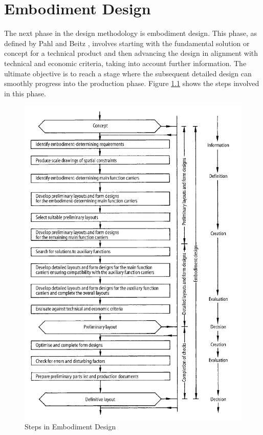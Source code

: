 \chapter{Embodiment Design}
The next phase in the design methodology is embodiment design. This phase, as defined by Pahl and Beitz \cite[227]{Pahl2007}, involves starting with the fundamental solution or concept for a technical product and then advancing the design in alignment with technical and economic criteria, taking into account further information. The ultimate objective is to reach a stage where the subsequent detailed design can smoothly progress into the production phase. Figure \ref{fig:embodiment_design} shows the steps involved in this phase.

\begin{figure}
    \centering
    \includegraphics[width=0.92\linewidth]{texs/Part1/chapter4/image/embodiment.png}
    \caption{Steps in Embodiment Design \cite[229]{Pahl2007}}
    \label{fig:embodiment_design}
\end{figure}

